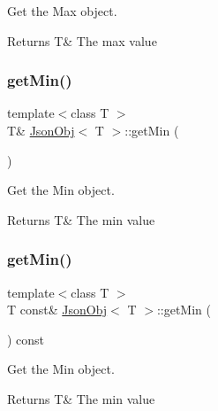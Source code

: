 Get the Max object. 

\begin{DoxyReturn}{Returns}
T\& The max value 
\end{DoxyReturn}
\mbox{\label{class_json_obj_a789404a7efe25c04646152502efb6eff}} 
\subsubsection{\texorpdfstring{get\+Min()}{getMin()}\hspace{0.1cm}{\footnotesize\ttfamily [1/2]}}
{\footnotesize\ttfamily template$<$class T $>$ \\
T\& \hyperlink{class_json_obj}{Json\+Obj}$<$ T $>$\+::get\+Min (\begin{DoxyParamCaption}{ }\end{DoxyParamCaption})\hspace{0.3cm}{\ttfamily [inline]}}



Get the Min object. 

\begin{DoxyReturn}{Returns}
T\& The min value 
\end{DoxyReturn}
\mbox{\label{class_json_obj_a6152503545a3085438ffbac09a98e67c}} 
\subsubsection{\texorpdfstring{get\+Min()}{getMin()}\hspace{0.1cm}{\footnotesize\ttfamily [2/2]}}
{\footnotesize\ttfamily template$<$class T $>$ \\
T const\& \hyperlink{class_json_obj}{Json\+Obj}$<$ T $>$\+::get\+Min (\begin{DoxyParamCaption}{ }\end{DoxyParamCaption}) const\hspace{0.3cm}{\ttfamily [inline]}}



Get the Min object. 

\begin{DoxyReturn}{Returns}
T\& The min value 
\end{DoxyReturn}
\mbox{\label{class_json_obj_a8111ceed590213968e777380f60e443a}} 
